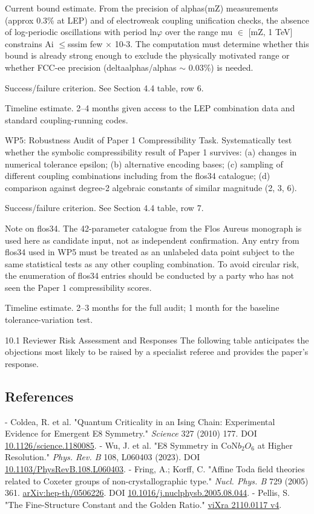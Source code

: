   Current bound estimate. From the precision of alphas(mZ) measurements (approx 0.3\%
  at LEP) and of electroweak coupling unification checks, the absence of log-periodic
  oscillations with period ln$\varphi$ over the range mu $\in$ [mZ, 1 TeV] constrains Ai $\leq$sssim few
  $\times$ 10-3. The computation must determine whether this bound is already strong enough
  to exclude the physically motivated range or whether FCC-ee precision
  (deltaalphas/alphas $\sim$ 0.03\%) is needed.

  Success/failure criterion. See Section 4.4 table, row 6.

  Timeline estimate. 2--4 months given access to the LEP combination data and standard
  coupling-running codes.

  WP5: Robustness Audit of Paper 1 Compressibility
  Task. Systematically test whether the symbolic compressibility result of Paper 1
  survives: (a) changes in numerical tolerance epsilon; (b) alternative encoding bases; (c)
  sampling of different coupling combinations including from the flos34 catalogue; (d)
  comparison against degree-2 algebraic constants of similar magnitude (2, 3, 6).

  Success/failure criterion. See Section 4.4 table, row 7.

  Note on flos34. The 42-parameter catalogue from the Flos Aureus monograph is used
  here as candidate input, not as independent confirmation. Any entry from flos34 used in
  WP5 must be treated as an unlabeled data point subject to the same statistical tests as
  any other coupling combination. To avoid circular risk, the enumeration of flos34
  entries should be conducted by a party who has not seen the Paper 1 compressibility
  scores.

  Timeline estimate. 2--3 months for the full audit; 1 month for the baseline
  tolerance-variation test.

  10.1 Reviewer Risk Assessment and Responses
  The following table anticipates the objections most likely to be raised by a specialist
  referee and provides the paper's response.

\subsection{References}

- Coldea, R. et al. "Quantum Criticality in an Ising Chain: Experimental Evidence for Emergent E8 Symmetry." \textit{Science} 327 (2010) 177. DOI \href{https://doi.org/10.1126/science.1180085}{10.1126/science.1180085}.
- Wu, J. et al. "E8 Symmetry in CoN$b_{2}$$O_{6}$ at Higher Resolution." \textit{Phys. Rev. B} 108, L060403 (2023). DOI \href{https://doi.org/10.1103/PhysRevB.108.L060403}{10.1103/PhysRevB.108.L060403}.
- Fring, A.; Korff, C. "Affine Toda field theories related to Coxeter groups of non-crystallographic type." \textit{Nucl. Phys. B} 729 (2005) 361. \href{https://arxiv.org/abs/hep-th/0506226}{arXiv:hep-th/0506226}. DOI \href{https://doi.org/10.1016/j.nuclphysb.2005.08.044}{10.1016/j.nuclphysb.2005.08.044}.
- Pellis, S. "The Fine-Structure Constant and the Golden Ratio." \href{https://vixra.org/pdf/2110.0117v4.pdf}{viXra 2110.0117 v4}.
